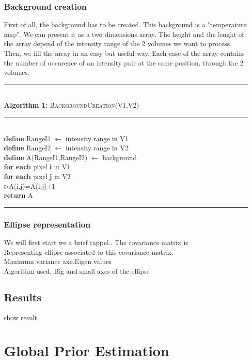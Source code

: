 \subsubsection{Background creation}
First of all, the background has to be created. This background is a "temperature map".
We can present it as a two dimensions array. The height and the lenght of the array depend of the intensity range of the 2 volumes we want to process.
Then, we fill the array in an easy but useful way. Each 
%
case
%
of the array contains the number of occurence of an intensity pair at the same position, through the 2 volumes.

\begin{minipage}{1\textwidth}
%
\hrule
\textbf{\\Algorithm 1:} \textsc{BackgroundCreation}(V1,V2)
\hrule
\textbf{\\define}  RangeI1 $\leftarrow$  intensity range in V1\\ 
\textbf{define}  RangeI2 $\leftarrow$  intensity range in V2\\ 
\textbf{define}  A(RangeI1,RangeI2) $\leftarrow$ background\\  
%
\textbf{for each} pixel \textbf{i} in V1\\
\textbf{for each} pixel \textbf{j} in V2\\
%
$\triangleright$A(i,j)=A(i,j)+1\\
%
\textbf{return} A\\
%
\hrule
%
\end{minipage}

\subsubsection{Ellipse representation}
We will first start we a brief
%
rappel..
%
The covariance matrix is \\
Representing ellipse associated to this covariance matrix.\\
Maximum variance axe.Eigen values\\
Algorithm used.
Big and small axes of the ellipse\\
\subsection{Results}
show result

\section{Global Prior Estimation}

